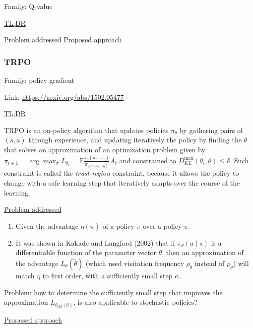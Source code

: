 \documentclass[12pt, english]{article}
\begin{document}
Family: Q-value

\underline{TL;DR}


\underline{Problem addressed}
\underline{Proposed approach}



\subsubsection{TRPO}
\label{TRPO}

Family: policy gradient

Link: \url{https://arxiv.org/abs/1502.05477}

\underline{TL;DR}

TRPO \cite{schulman_trust_2015-1} is an on-policy algorithm that updates policies $\pi_\theta$ by gathering pairs of $(s,a)$ through experience, and updating iteratively the policy by finding the $\theta$ that solves an approximation of an optimization problem given by $\pi_{i+1} = \arg\max_\pi L_{\theta_i} = \mathbb{E} \frac{\pi_\theta(a_t \mid s_t)}{\pi_{\theta_old (a_t \mid s_t)}} A_t$ and constrained to $D_{KL}^{\max}(\theta_i, \theta) \leq \delta$. Such constraint is called the \textit{trust region} constraint, because it allows the policy to change with a safe learning step that iteratively adapts over the course of the learning.

\underline{Problem addressed}

\begin{enumerate}
  \item Given the advantage $\eta(\tilde{\pi})$ of a policy $\tilde{\pi}$ over a policy $\pi$.
  \item It was shown in Kakade and Langford (2002) that if $\pi_\theta(a \mid s)$ is a differentiable function of the parameter vector $\theta$, then an approximation of the advantage $L_\theta(\tilde{\theta})$ (which used visitation frequency $\rho_\theta$ instead of $\rho_{\tilde{\theta}}$) will match $\eta$ to first order, with a sufficiently small step $\alpha$.
\end{enumerate}

Problem: how to determine the sufficiently small step that improves the approximation $L_{\theta_{old}(\theta)}$, is also applicable to stochastic policies?


\underline{Proposed approach}
\end{document}
